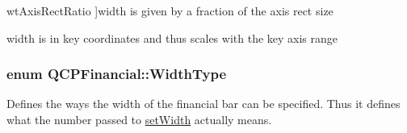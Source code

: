 \begin{Desc}
\begin{description}
{wt\+Axis\+Rect\+Ratio\hypertarget{class_q_c_p_financial_aef1761dda71a53dc5269685e9e492626a6c3024ab68e1937cd2aaae8b1467b46a}{}\label{class_q_c_p_financial_aef1761dda71a53dc5269685e9e492626a6c3024ab68e1937cd2aaae8b1467b46a}
}]width is given by a fraction of the axis rect size \item[{\em 
wt\+Plot\+Coords\hypertarget{class_q_c_p_financial_aef1761dda71a53dc5269685e9e492626aebf2679f42649543a6cf372741d03ea3}{}\label{class_q_c_p_financial_aef1761dda71a53dc5269685e9e492626aebf2679f42649543a6cf372741d03ea3}
}]width is in key coordinates and thus scales with the key axis range \end{description}
\end{Desc}
\subsubsection[{\texorpdfstring{Width\+Type}{WidthType}}]{\setlength{\rightskip}{0pt plus 5cm}enum {\bf Q\+C\+P\+Financial\+::\+Width\+Type}}\hypertarget{class_q_c_p_financial_aef1761dda71a53dc5269685e9e492626}{}\label{class_q_c_p_financial_aef1761dda71a53dc5269685e9e492626}
Defines the ways the width of the financial bar can be specified. Thus it defines what the number passed to \hyperlink{class_q_c_p_financial_a99633f8bac86a61d534ae5eeb1a3068f}{set\+Width} actually means.

